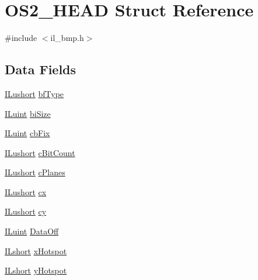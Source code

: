 \hypertarget{struct_o_s2___h_e_a_d}{\section{O\-S2\-\_\-\-H\-E\-A\-D Struct Reference}
\label{struct_o_s2___h_e_a_d}
}


{\ttfamily \#include $<$il\-\_\-bmp.\-h$>$}

\subsection*{Data Fields}
\begin{DoxyCompactItemize}
\item 
\hyperlink{il_8h_af6287b43748354a7c4864da43ae56962}{I\-Lushort} \hyperlink{struct_o_s2___h_e_a_d_a8a40beb9709069c26645eaa7ffe1635a}{bf\-Type}
\item 
\hyperlink{il_8h_ac6508d0e9c19e32f32e00d54b5b8cf30}{I\-Luint} \hyperlink{struct_o_s2___h_e_a_d_a424d2cf5b3bbbdb19ae4e74bd1edc939}{bi\-Size}
\item 
\hyperlink{il_8h_ac6508d0e9c19e32f32e00d54b5b8cf30}{I\-Luint} \hyperlink{struct_o_s2___h_e_a_d_a3b696009d29862348e1b4cea3c8f957c}{cb\-Fix}
\item 
\hyperlink{il_8h_af6287b43748354a7c4864da43ae56962}{I\-Lushort} \hyperlink{struct_o_s2___h_e_a_d_a778e695ef5151247d2b033ce5637c910}{c\-Bit\-Count}
\item 
\hyperlink{il_8h_af6287b43748354a7c4864da43ae56962}{I\-Lushort} \hyperlink{struct_o_s2___h_e_a_d_a7cb2e34d4dc1dd33cfacf847ecf5ea9d}{c\-Planes}
\item 
\hyperlink{il_8h_af6287b43748354a7c4864da43ae56962}{I\-Lushort} \hyperlink{struct_o_s2___h_e_a_d_a056c5b3b64268265fefb765e17f5434a}{cx}
\item 
\hyperlink{il_8h_af6287b43748354a7c4864da43ae56962}{I\-Lushort} \hyperlink{struct_o_s2___h_e_a_d_a5226d513873fb17e513a5f9dee05f5bc}{cy}
\item 
\hyperlink{il_8h_ac6508d0e9c19e32f32e00d54b5b8cf30}{I\-Luint} \hyperlink{struct_o_s2___h_e_a_d_ae8d05a40ffdae0d5eeda790d969f79f4}{Data\-Off}
\item 
\hyperlink{il_8h_afc75ded918970afe7517d3f7f0561db3}{I\-Lshort} \hyperlink{struct_o_s2___h_e_a_d_affcb3f103c1fe344216fec7da1b005b7}{x\-Hotspot}
\item 
\hyperlink{il_8h_afc75ded918970afe7517d3f7f0561db3}{I\-Lshort} \hyperlink{struct_o_s2___h_e_a_d_a3942449af717e5b78aea818cb7a24c89}{y\-Hotspot}
\end{DoxyCompactItemize}


